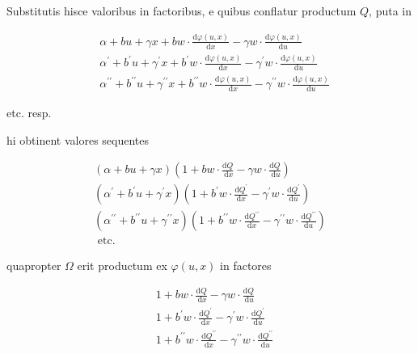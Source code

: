 \documentclass[10pt]{article}
\begin{document}
Substitutis hisce valoribus in factoribus, e quibus conflatur productum \(Q\), puta in

\[
\begin{aligned}
& \alpha+b u+\gamma x+b w \cdot \frac{\mathrm{d} \varphi(u, x)}{\mathrm{d} x}-\gamma w \cdot \frac{\mathrm{d} \varphi(u, x)}{\mathrm{d} u} \\
& \alpha^{\prime}+b^{\prime} u+\gamma^{\prime} x+b^{\prime} w \cdot \frac{\mathrm{d} \varphi(u, x)}{\mathrm{d} x}-\gamma^{\prime} w \cdot \frac{\mathrm{d} \varphi(u, x)}{\mathrm{d} u} \\
& \alpha^{\prime \prime}+b^{\prime \prime} u+\gamma^{\prime \prime} x+b^{\prime \prime} w \cdot \frac{\mathrm{d} \varphi(u, x)}{\mathrm{d} x}-\gamma^{\prime \prime} w \cdot \frac{\mathrm{d} \varphi(u, x)}{\mathrm{d} u}
\end{aligned}
\]

etc. resp.

hi obtinent valores sequentes

\[
\begin{gathered}
(\alpha+b u+\gamma x)\left(1+b w \cdot \frac{\mathrm{d} Q}{\mathrm{~d} x}-\gamma w \cdot \frac{\mathrm{d} Q}{\mathrm{~d} u}\right) \\
\left(\alpha^{\prime}+b^{\prime} u+\gamma^{\prime} x\right)\left(1+b^{\prime} w \cdot \frac{\mathrm{d} Q^{\prime}}{\mathrm{d} x}-\gamma^{\prime} w \cdot \frac{\mathrm{d} Q^{\prime}}{\mathrm{d} u}\right) \\
\left(\alpha^{\prime \prime}+b^{\prime \prime} u+\gamma^{\prime \prime} x\right)\left(1+b^{\prime \prime} w \cdot \frac{\mathrm{d} Q^{\prime \prime}}{\mathrm{d} x}-\gamma^{\prime \prime} w \cdot \frac{\mathrm{d} Q^{\prime \prime}}{\mathrm{d} u}\right) \\
\text { etc. }
\end{gathered}
\]

quapropter \(\Omega\) erit productum ex \(\varphi(u, x)\) in factores

\[
\begin{aligned}
& 1+b w \cdot \frac{\mathrm{d} Q}{\mathrm{~d} x}-\gamma w \cdot \frac{\mathrm{d} Q}{\mathrm{~d} u} \\
& 1+b^{\prime} w \cdot \frac{\mathrm{d} Q^{\prime}}{\mathrm{d} x}-\gamma^{\prime} w \cdot \frac{\mathrm{d} Q^{\prime}}{\mathrm{d} u} \\
& 1+b^{\prime \prime} w \cdot \frac{\mathrm{d} Q^{\prime \prime}}{\mathrm{d} x}-\gamma^{\prime \prime} w \cdot \frac{\mathrm{d} Q^{\prime \prime}}{\mathrm{d} u}
\end{aligned}
\]
\end{document}
